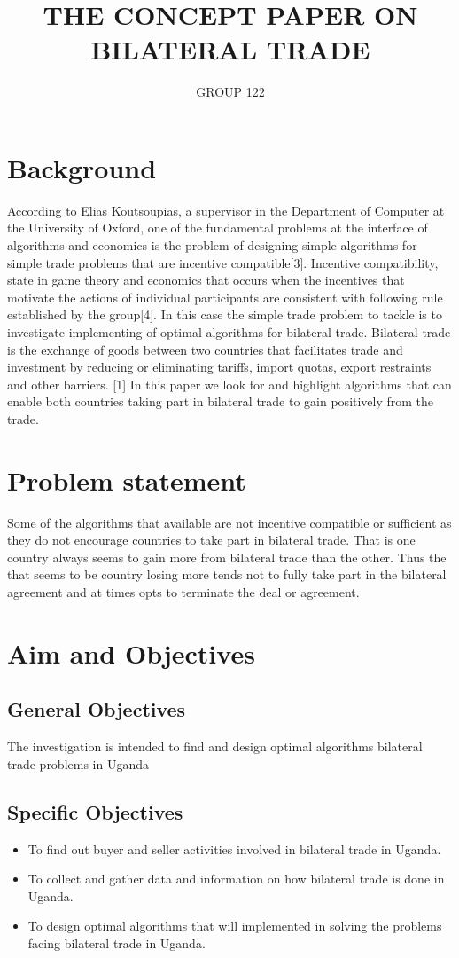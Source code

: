 \documentclass[12pt,a4paper]{article}
\title{THE CONCEPT PAPER ON BILATERAL TRADE}
\author{GROUP 122}
\begin{document}
\section{Background}
According to Elias Koutsoupias, a supervisor in the Department of Computer at the University of Oxford, one of the fundamental problems at the interface of algorithms and economics is the problem of designing simple algorithms for simple trade problems that are incentive compatible[3]. Incentive compatibility, state in game theory and economics that occurs when the incentives that motivate the actions of individual participants are consistent with following rule established by the group[4]. In this case the simple trade problem to tackle is to investigate implementing of optimal algorithms for bilateral trade. Bilateral trade is the exchange of goods between two countries that facilitates trade and investment by reducing or eliminating tariffs, import quotas, export restraints and other barriers. [1] In this paper we look for and highlight algorithms that can enable both countries taking part in bilateral trade to gain positively from the trade.
\section{Problem statement}
Some of the algorithms that available are not incentive compatible or sufficient as they do not encourage countries to take part in bilateral trade. That is one country always seems to gain more from bilateral trade than the other. Thus the that seems to be country losing more tends not to fully take part in the bilateral agreement and at times opts to terminate the deal or agreement.
\section{Aim and Objectives}
\subsection{General Objectives}
The investigation is intended to find and design optimal algorithms bilateral trade problems in Uganda
\subsection{Specific Objectives}
\begin{itemize}
\item To find out buyer and seller activities involved in bilateral trade in Uganda.
\item To collect and gather data and information on how bilateral trade is done in Uganda.
\item To design optimal algorithms that will implemented in solving the problems facing bilateral trade in Uganda.
\end{itemize}
\end{document}
